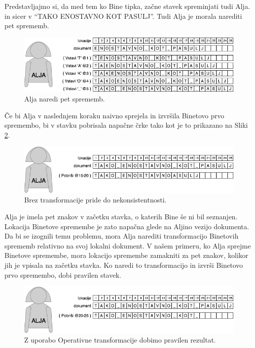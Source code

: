 \documentclass[a4paper, 12pt, twoside]{book}
\begin{document}
Predstavljajmo si, da med tem ko Bine tipka, začne stavek spreminjati tudi Alja. in sicer v “TAKO ENOSTAVNO KOT PASULJ”. Tudi Alja je morala narediti pet sprememb.

\begin{figure}[placement h]
\begin{center}
\includegraphics[width=12cm]{ot2.png}
\end{center}
\caption{Alja naredi pet sprememb.}
\label{ot2}
\end{figure}

Če bi Alja v naslednjem koraku naivno sprejela in izvršila Binetovo prvo spremembo, bi v stavku pobrisala napačne črke tako kot je to prikazano na Sliki \ref{ot3}.

\begin{figure}[placement h]
\begin{center}
\includegraphics[width=12cm]{ot3.png}
\end{center}
\caption{Brez transformacije pride do nekonsistentnosti.}
\label{ot3}
\end{figure}

\pagebreak

Alja je imela pet znakov v začetku stavka, o katerih Bine še ni bil seznanjen. Lokacija Binetove spremembe je zato napačna glede na Aljino vezijo dokumenta. Da bi se izognili temu problemu, mora Alja narediti transformacijo Binetovih sprememb relativno na svoj lokalni dokument. V našem primeru, ko Alja sprejme Binetove spremembe, mora lokacijo spremembe zamakniti za pet znakov, kolikor jih je vpisala na začetku stavka. Ko naredi to transformacijo in izvrši Binetovo prvo spremembo, dobi pravilen stavek.

\begin{figure}[placement h]
\begin{center}
\includegraphics[width=12cm]{ot4.png}
\end{center}
\caption{Z uporabo Operativne transformacije dobimo pravilen rezultat.}
\label{ot4}
\end{figure}
\end{document}
